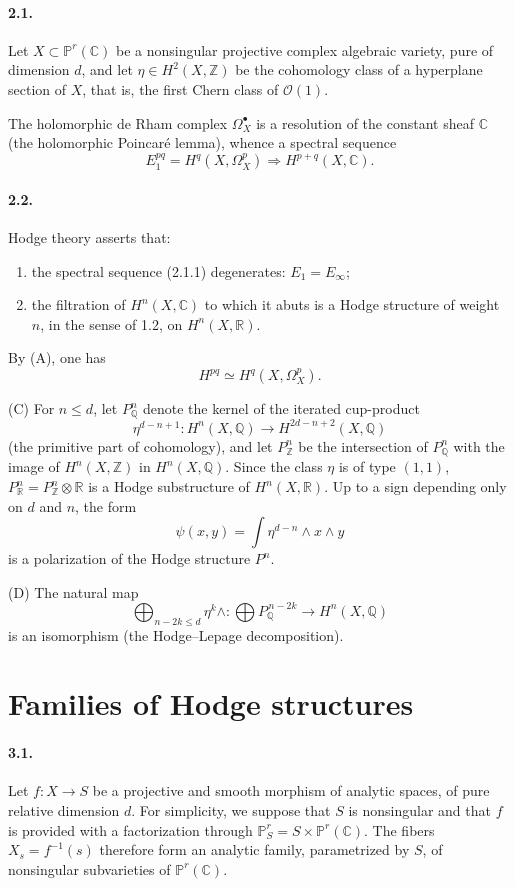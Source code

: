 \documentclass[10pt]{article}
\newcommand{\C}{\mathbb C}
\newcommand{\R}{\mathbb R}
\newcommand{\Z}{\mathbb Z}
\newcommand{\Q}{\mathbb Q}
\newcommand{\Pj}{\mathbb P}
\newcommand{\cO}{\mathcal O}
\theoremstyle{deligne}
\begin{document}
\paragraph{2.1.}
Let $X\subset\Pj^r(\C)$ be a nonsingular projective complex algebraic variety, pure of dimension $d$, and let $\eta\in H^2(X,\Z)$ be the cohomology class of a hyperplane section of $X$, that is, the first Chern class of $\cO(1)$.

The holomorphic de Rham complex $\Omega_X^\bullet$ is a resolution of the constant sheaf $\C$ (the holomorphic Poincaré lemma), whence a spectral sequence
\begin{equation}
E_1^{pq}=H^q(X,\Omega_X^p)\Rightarrow H^{p+q}(X,\C).
\tag{2.1.1}
\end{equation}

\paragraph{2.2.}
Hodge theory asserts that:
\begin{enumerate}[label=(\Alph*)]
\item the spectral sequence (2.1.1) degenerates: $E_1=E_\infty$;
\item the filtration of $H^n(X,\C)$ to which it abuts is a Hodge structure of weight $n$, in the sense of 1.2, on $H^n(X,\R)$.
\end{enumerate}
By (A), one has
\[
H^{pq}\simeq H^q(X,\Omega_X^p).
\]

(C) For $n\le d$, let $P_\Q^n$ denote the kernel of the iterated cup-product
\[
\eta^{d-n+1}:H^n(X,\Q)\longrightarrow H^{2d-n+2}(X,\Q)
\]
(the primitive part of cohomology), and let $P_\Z^n$ be the intersection of $P_\Q^n$ with the image of $H^n(X,\Z)$ in $H^n(X,\Q)$. Since the class $\eta$ is of type $(1,1)$, $P_\R^n=P_\Z^n\otimes\R$ is a Hodge substructure of $H^n(X,\R)$. Up to a sign depending only on $d$ and $n$, the form
\[
\psi(x,y)=\int \eta^{d-n}\wedge x\wedge y
\]
is a polarization of the Hodge structure $P^n$.

(D) The natural map
\[
\bigoplus_{n-2k\le d}\eta^k\wedge:
\bigoplus P_\Q^{\,n-2k}\longrightarrow H^n(X,\Q)
\]
is an isomorphism (the Hodge--Lepage decomposition).

\section{Families of Hodge structures}

\paragraph{3.1.}
Let $f:X\to S$ be a projective and smooth morphism of analytic spaces, of pure relative dimension $d$. For simplicity, we suppose that $S$ is nonsingular and that $f$ is provided with a factorization through $\Pj^r_S=S\times\Pj^r(\C)$. The fibers $X_s=f^{-1}(s)$ therefore form an analytic family, parametrized by $S$, of nonsingular subvarieties of $\Pj^r(\C)$.
\end{document}
